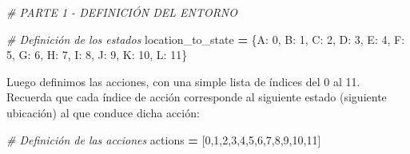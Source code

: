 \documentclass[
]{book}
\newenvironment{Shaded}{\begin{snugshade}}{\end{snugshade}}
\newcommand{\CommentTok}[1]{\textcolor[rgb]{0.56,0.35,0.01}{\textit{#1}}}
\newcommand{\DecValTok}[1]{\textcolor[rgb]{0.00,0.00,0.81}{#1}}
\newcommand{\NormalTok}[1]{#1}
\newcommand{\OperatorTok}[1]{\textcolor[rgb]{0.81,0.36,0.00}{\textbf{#1}}}
\newcommand{\StringTok}[1]{\textcolor[rgb]{0.31,0.60,0.02}{#1}}
\begin{document}
\begin{Shaded}
\begin{Highlighting}[]
\CommentTok{\# PARTE 1 {-} DEFINICIÓN DEL ENTORNO}

\CommentTok{\# Definición de los estados}
\NormalTok{location\_to\_state }\OperatorTok{=}\NormalTok{ \{}\StringTok{\textquotesingle{}A\textquotesingle{}}\NormalTok{: }\DecValTok{0}\NormalTok{,}
                     \StringTok{\textquotesingle{}B\textquotesingle{}}\NormalTok{: }\DecValTok{1}\NormalTok{,}
                     \StringTok{\textquotesingle{}C\textquotesingle{}}\NormalTok{: }\DecValTok{2}\NormalTok{,}
                     \StringTok{\textquotesingle{}D\textquotesingle{}}\NormalTok{: }\DecValTok{3}\NormalTok{,}
                     \StringTok{\textquotesingle{}E\textquotesingle{}}\NormalTok{: }\DecValTok{4}\NormalTok{,}
                     \StringTok{\textquotesingle{}F\textquotesingle{}}\NormalTok{: }\DecValTok{5}\NormalTok{,}
                     \StringTok{\textquotesingle{}G\textquotesingle{}}\NormalTok{: }\DecValTok{6}\NormalTok{,}
                     \StringTok{\textquotesingle{}H\textquotesingle{}}\NormalTok{: }\DecValTok{7}\NormalTok{,}
                     \StringTok{\textquotesingle{}I\textquotesingle{}}\NormalTok{: }\DecValTok{8}\NormalTok{,}
                     \StringTok{\textquotesingle{}J\textquotesingle{}}\NormalTok{: }\DecValTok{9}\NormalTok{,}
                     \StringTok{\textquotesingle{}K\textquotesingle{}}\NormalTok{: }\DecValTok{10}\NormalTok{,}
                     \StringTok{\textquotesingle{}L\textquotesingle{}}\NormalTok{: }\DecValTok{11}\NormalTok{\}}
\end{Highlighting}
\end{Shaded}

Luego definimos las acciones, con una simple lista de índices del 0 al 11. Recuerda que cada índice de acción corresponde al siguiente estado (siguiente ubicación) al que conduce dicha acción:

\begin{Shaded}
\begin{Highlighting}[]
\CommentTok{\# Definición de las acciones}
\NormalTok{actions }\OperatorTok{=}\NormalTok{ [}\DecValTok{0}\NormalTok{,}\DecValTok{1}\NormalTok{,}\DecValTok{2}\NormalTok{,}\DecValTok{3}\NormalTok{,}\DecValTok{4}\NormalTok{,}\DecValTok{5}\NormalTok{,}\DecValTok{6}\NormalTok{,}\DecValTok{7}\NormalTok{,}\DecValTok{8}\NormalTok{,}\DecValTok{9}\NormalTok{,}\DecValTok{10}\NormalTok{,}\DecValTok{11}\NormalTok{]}
\end{Highlighting}
\end{Shaded}
\end{document}
